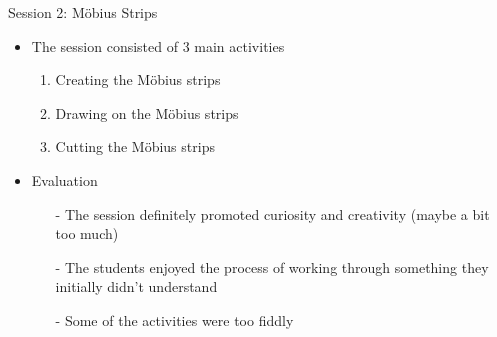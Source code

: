 \documentclass{beamer}  %
\begin{document}
\begin{frame}{Session 2: M\"{o}bius Strips}
    \begin{itemize}
        \item The session consisted of 3 main activities
        \begin{enumerate}
            \item Creating the M\"{o}bius strips
            \item Drawing on the M\"{o}bius strips
            \item Cutting the  M\"{o}bius strips
        \end{enumerate}

        \vspace{10pt}

        \item Evaluation
        \begin{itemize}
            \item[-] The session definitely promoted curiosity and creativity  (maybe a bit too much)
            \item[-] The students enjoyed the process of working through something they initially didn't understand
            \item[-] Some of the activities were too fiddly 
        \end{itemize}
    \end{itemize}
\end{frame}
\end{document}
